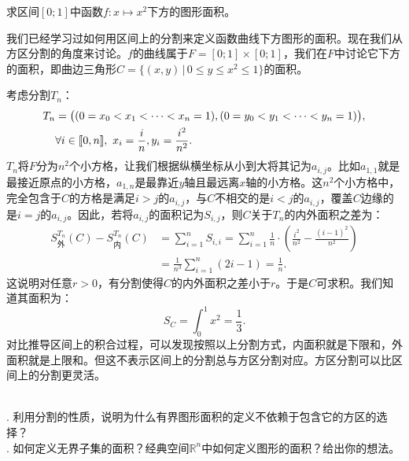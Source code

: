 \documentclass[12pt,UTF8]{ctexbook}
\begin{document}
\begin{et}
    求区间$[0;1]$中函数$f:x\mapsto x^2$下方的图形面积。
\end{et}
\begin{so}
    我们已经学习过如何用区间上的分割来定义函数曲线下方图形的面积。现在我们从方区分割的角度来讨论。$f$的曲线属于$F=[0;1]\times[0;1]$，我们在$F$中讨论它下方的面积，即曲边三角形$C = \{(x,y)\,|\,0\leqslant y\leqslant x^2\leqslant 1\}$的面积。

    考虑分割$T_n$：
    \begin{align*}
        T_n &= \big((0=x_0<x_1<\cdots<x_n=1),(0=y_0<y_1<\cdots<y_n=1)\big),\\
    &\forall i\in[\![0,n]\!],\,\, x_i = \frac{i}{n}, y_i = \frac{i^2}{n^2}.
    \end{align*} 
    $T_n$将$F$分为$n^2$个小方格，让我们根据纵横坐标从小到大将其记为$a_{i,j}$。比如$a_{1,1}$就是最接近原点的小方格，$a_{1,n}$是最靠近$y$轴且最远离$x$轴的小方格。这$n^2$个小方格中，完全包含于$C$的方格是满足$i>j$的$a_{i,j}$，与$C$不相交的是$i<j$的$a_{i,j}$，覆盖$C$边缘的是$i=j$的$a_{i,j}$。因此，若将$a_{i,j}$的面积记为$S_{i,j}$，则$C$关于$T_n$的内外面积之差为：
    \begin{align*}
        S_{\text{外}}^{T_n}(C) - S_{\text{内}}^{T_n}(C) &= \sum_{i=1}^n S_{i,i} = \sum_{i=1}^n \frac{1}{n}\cdot\left(\frac{i^2}{n^2} - \frac{(i-1)^2}{n^2}\right) \\
        &= \frac{1}{n^3}\sum_{i=1}^n (2i - 1) = \frac{1}{n}.
    \end{align*}
    这说明对任意$r>0$，有分割使得$C$的内外面积之差小于$r$。于是$C$可求积。我们知道其面积为：
    $$S_C = \int_{0}^1 x^2 = \frac{1}{3}.$$
    对比推导区间上的积合过程，可以发现按照以上分割方式，内面积就是下限和，外面积就是上限和。但这不表示区间上的分割总与方区分割对应。方区分割可以比区间上的分割更灵活。
\end{so}

\begin{sk}
    \mbox{} \\
    . 利用分割的性质，说明为什么有界图形面积的定义不依赖于包含它的方区的选择？\\
    . 如何定义无界子集的面积？经典空间$\mathbb{R}^n$中如何定义图形的面积？给出你的想法。
\end{sk}
\end{document}
